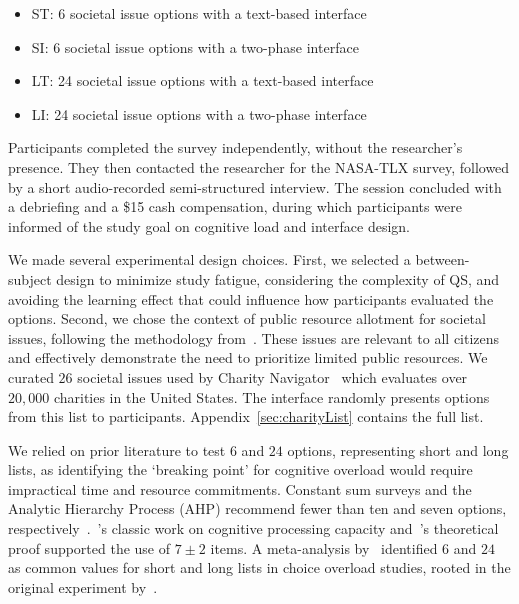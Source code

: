 \begin{itemize}
    \item ST: 6 societal issue options with a text-based interface
    \item SI: 6 societal issue options with a two-phase interface
    \item LT: 24 societal issue options with a text-based interface
    \item LI: 24 societal issue options with a two-phase interface
\end{itemize}

Participants completed the survey independently, without the researcher's presence. They then contacted the researcher for the NASA-TLX survey, followed by a short audio-recorded semi-structured interview. The session concluded with a debriefing and a \$15 cash compensation, during which participants were informed of the study goal on cognitive load and interface design.

We made several experimental design choices. First, we selected a between-subject design to minimize study fatigue, considering the complexity of QS, and avoiding the learning effect that could influence how participants evaluated the options. Second, we chose the context of public resource allotment for societal issues, following the methodology from~\textcite{chengCanShowWhat2021}. These issues are relevant to all citizens and effectively demonstrate the need to prioritize limited public resources. We curated $26$ societal issues used by Charity Navigator~\cite{CharityNavigator2023} which evaluates over $20,000$ charities in the United States. The interface randomly presents options from this list to participants. Appendix~\ref{sec:charityList} contains the full list.

We relied on prior literature to test $6$ and $24$ options, representing short and long lists, as identifying the `breaking point' for cognitive overload would require impractical time and resource commitments. Constant sum surveys and the Analytic Hierarchy Process (AHP) recommend fewer than ten and seven options, respectively~\cite{moroneyQuestionnaireDesignHow2019, saatyGroupDecisionMaking2013, saatyPrinciplesAnalyticHierarchy1987}.~\textcite{millerMagicalNumberSeven1956}'s classic work on cognitive processing capacity and~\textcite{saaty2003magic}'s theoretical proof supported the use of $7\pm2$ items. A meta-analysis by~\textcite{chernevChoiceOverloadConceptual2015} identified $6$ and $24$ as common values for short and long lists in choice overload studies, rooted in the original experiment by~\textcite{iyengarWhenChoiceDemotivating2000}.

